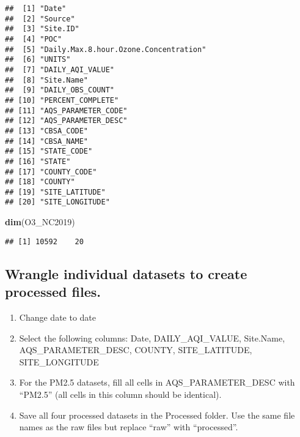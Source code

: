 \documentclass[
]{article}
\newenvironment{Shaded}{\begin{snugshade}}{\end{snugshade}}
\newcommand{\KeywordTok}[1]{\textcolor[rgb]{0.13,0.29,0.53}{\textbf{#1}}}
\newcommand{\NormalTok}[1]{#1}
\providecommand{\tightlist}{%
  \setlength{\itemsep}{0pt}\setlength{\parskip}{0pt}}
\begin{document}
\begin{verbatim}
##  [1] "Date"                                
##  [2] "Source"                              
##  [3] "Site.ID"                             
##  [4] "POC"                                 
##  [5] "Daily.Max.8.hour.Ozone.Concentration"
##  [6] "UNITS"                               
##  [7] "DAILY_AQI_VALUE"                     
##  [8] "Site.Name"                           
##  [9] "DAILY_OBS_COUNT"                     
## [10] "PERCENT_COMPLETE"                    
## [11] "AQS_PARAMETER_CODE"                  
## [12] "AQS_PARAMETER_DESC"                  
## [13] "CBSA_CODE"                           
## [14] "CBSA_NAME"                           
## [15] "STATE_CODE"                          
## [16] "STATE"                               
## [17] "COUNTY_CODE"                         
## [18] "COUNTY"                              
## [19] "SITE_LATITUDE"                       
## [20] "SITE_LONGITUDE"
\end{verbatim}

\begin{Shaded}
\begin{Highlighting}[]
\KeywordTok{dim}\NormalTok{(O3_NC2019)}
\end{Highlighting}
\end{Shaded}

\begin{verbatim}
## [1] 10592    20
\end{verbatim}

\hypertarget{wrangle-individual-datasets-to-create-processed-files.}{%
\subsection{Wrangle individual datasets to create processed
files.}\label{wrangle-individual-datasets-to-create-processed-files.}}

\begin{enumerate}
\def\labelenumi{\arabic{enumi}.}
\setcounter{enumi}{2}
\tightlist
\item
  Change date to date
\item
  Select the following columns: Date, DAILY\_AQI\_VALUE, Site.Name,
  AQS\_PARAMETER\_DESC, COUNTY, SITE\_LATITUDE, SITE\_LONGITUDE
\item
  For the PM2.5 datasets, fill all cells in AQS\_PARAMETER\_DESC with
  ``PM2.5'' (all cells in this column should be identical).
\item
  Save all four processed datasets in the Processed folder. Use the same
  file names as the raw files but replace ``raw'' with ``processed''.
\end{enumerate}
\end{document}
